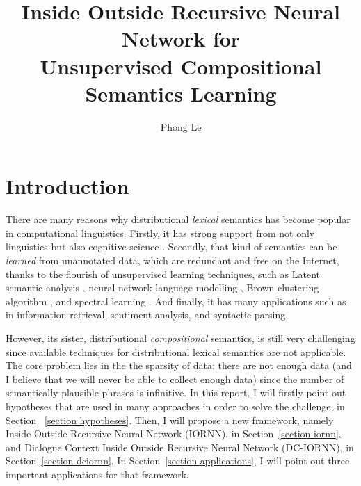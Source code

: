 \documentclass[10pt]{article}
\title{Inside Outside Recursive Neural Network for\\
Unsupervised Compositional Semantics Learning}
\author{Phong Le}
\begin{document}
\maketitle

\section{Introduction}
\label{section introduction}

There are many reasons why distributional \textit{lexical} semantics has become popular in 
computational linguistics. Firstly, it has strong support from not only linguistics but
also cognitive science \citep{lenci_distributional_2008}. Secondly, that kind of semantics 
can be \textit{learned} 
from unannotated data, which are redundant and free on the Internet, thanks to 
the flourish of unsupervised learning techniques, such as  Latent semantic analysis 
\citep{landauer1998introduction}, neural network 
language modelling \citep{collobert_natural_2011, huang2012improving}, Brown clustering
algorithm \citep{brown1992class}, and 
spectral learning \citep{dhillon2012two}. And finally, it has many applications such as 
in information retrieval, sentiment analysis, and syntactic parsing.

However, its sister, distributional \textit{compositional} semantics, is still very 
challenging since available techniques for distributional lexical semantics are not 
applicable. The core problem lies in the the sparsity of data: there are not enough 
data (and I believe that we will never be able to collect enough data) since the number 
of semantically plausible phrases is infinitive. In this report, I will firstly point out  
hypotheses that are used in many approaches in order to solve the challenge, in Section~
\ref{section hypotheses}. Then, I will propose a new framework, namely Inside 
Outside Recursive Neural Network (IORNN), in Section~\ref{section iornn}, and Dialogue Context 
Inside Outside Recursive Neural Network (DC-IORNN), in Section~\ref{section dciornn}. 
In Section~\ref{section applications}, I will point out three important applications for that framework.

\end{document}
